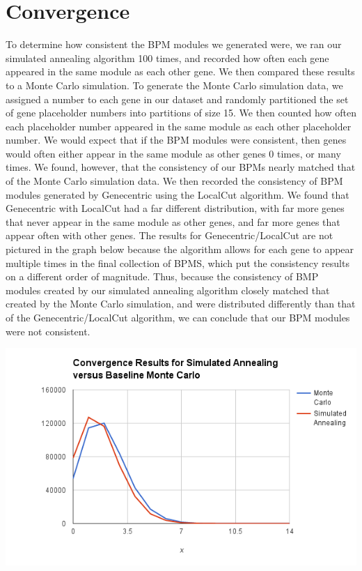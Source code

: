 \documentclass[11pt]{article}
\begin{document}
\section{Convergence}
To determine how consistent the BPM modules we generated were, we ran our simulated annealing algorithm 100 times, and recorded how often each gene appeared in the same module as each other gene. We then compared these results to a Monte Carlo simulation. To generate the Monte Carlo simulation data, we assigned a number to each gene in our dataset and randomly partitioned the set of gene placeholder numbers into partitions of size 15. We then counted how often each placeholder number appeared in the same module as each other placeholder number. We would expect that if the BPM modules were consistent, then genes would often either appear in the same module as other genes 0 times, or many times. We found, however, that the consistency of our BPMs nearly matched that of the Monte Carlo simulation data. We then recorded the consistency of BPM modules generated by Genecentric using the LocalCut algorithm. We found that Genecentric with LocalCut had a far different distribution, with far more genes that never appear in the same module as other genes, and far more genes that appear often with other genes. The results for Genecentric/LocalCut are not pictured in the graph below because the algorithm allows for each gene to appear multiple times in the final collection of BPMS, which put the consistency results on a different order of magnitude. Thus, because the consistency of BMP modules created by our simulated annealing algorithm closely matched that created by the Monte Carlo simulation, and were distributed differently than that of the Genecentric/LocalCut algorithm, we can conclude that our BPM modules were not consistent. 

\includegraphics[scale=0.8]{convergence.png}
\end{document}
